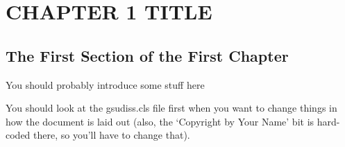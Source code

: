 \chapter{CHAPTER 1 TITLE}

\section{The First Section of the First Chapter}
	You should probably introduce some stuff here
    
    You should look at the gsudiss.cls file first when you want to change things in how the document is laid out (also, the `Copyright by Your Name' bit is hard-coded there, so you'll have to change that).